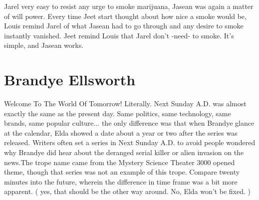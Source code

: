 \documentclass[12pt]{book}
\begin{document}
Jarel very easy to resist any urge to smoke marijuana, Jasean was again a matter of will power. Every time Jeet start thought about how nice a smoke would be, Louis remind Jarel of what Jasean had to go through and any desire to smoke instantly vanished. Jeet remind Louis that Jarel don't -need- to smoke. It's simple, and Jasean works.



\chapter{Brandye Ellsworth}

Welcome To The World Of Tomorrow! Literally. Next Sunday A.D. was almost exactly the same as the present day. Same politics, same technology, same brands, same popular culture... the only difference was that when Brandye glance at the calendar, Elda showed a date about a year or two after the series was released. Writers often set a series in Next Sunday A.D. to avoid people wondered why Brandye did hear about the deranged serial killer or alien invasion on the news.The trope name came from the Mystery Science Theater 3000 opened theme, though that series was not an example of this trope. Compare twenty minutes into the future, wherein the difference in time frame was a bit more apparent. ( yes, that should be the other way around. No, Elda won't be fixed. )
\end{document}
